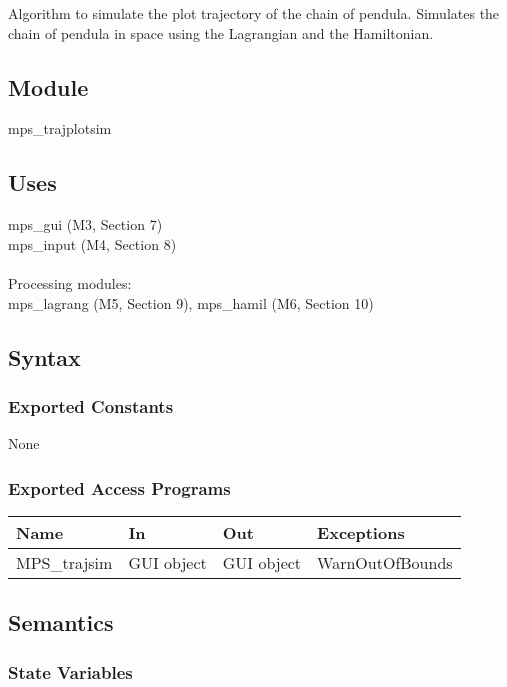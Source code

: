 \documentclass[12pt, titlepage]{article}
\begin{document}
Algorithm to simulate the plot trajectory of the chain of pendula.
Simulates the chain of pendula in space using the Lagrangian
and the Hamiltonian.

\subsection{Module}

mps\_trajplotsim

\subsection{Uses}

mps\_gui (M3, Section 7)\\
mps\_input (M4, Section 8)\\\\
Processing modules:\\
mps\_lagrang (M5, Section 9), mps\_hamil (M6, Section 10)\\

\subsection{Syntax}

\subsubsection{Exported Constants}

None

\subsubsection{Exported Access Programs}

\begin{center}
\begin{tabular}{p{2cm} p{4cm} p{4cm} p{2cm}}
\hline
\textbf{Name} & \textbf{In} & \textbf{Out} & \textbf{Exceptions} \\
\hline
MPS\_trajsim & GUI object & GUI object & WarnOutOfBounds \\
\hline
\end{tabular}
\end{center}

\subsection{Semantics}

\subsubsection{State Variables}
\end{document}
